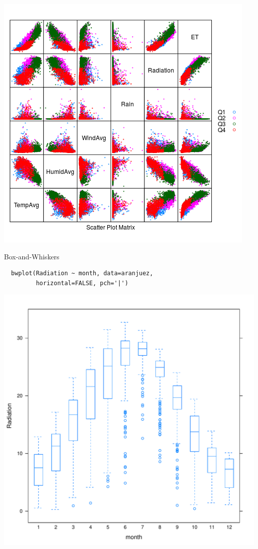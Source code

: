 \documentclass[xcolor={usenames,svgnames,dvipsnames}]{beamer}
\begin{document}
\begin{frame}[label=sec-6-1-23]{}
\includegraphics[width=.9\linewidth]{figs/splomGroup.png}
\end{frame}

\begin{frame}[fragile,label=sec-6-1-24]{Box-and-Whiskers}
 \lstset{language=R,label= ,caption= ,numbers=none}
\begin{lstlisting}
  bwplot(Radiation ~ month, data=aranjuez,
         horizontal=FALSE, pch='|')
\end{lstlisting}
\end{frame}

\begin{frame}[label=sec-6-1-25]{}
\includegraphics[width=.9\linewidth]{figs/bwplot.pdf}
\end{frame}
\end{document}
